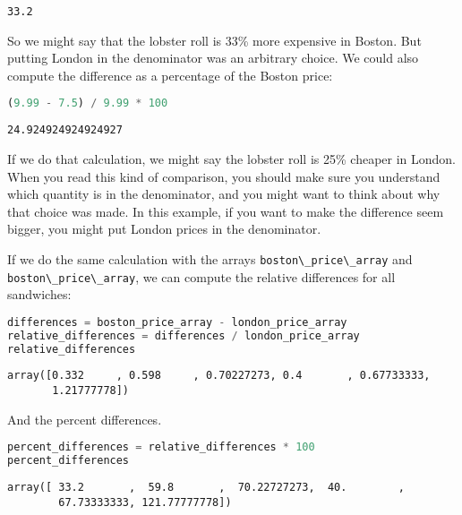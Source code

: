 \begin{lstlisting}[style=output]
33.2
\end{lstlisting}

So we might say that the lobster roll is 33\% more expensive in Boston.
But putting London in the denominator was an arbitrary choice. We could
also compute the difference as a percentage of the Boston price:

\begin{lstlisting}[language=Python,style=source]
(9.99 - 7.5) / 9.99 * 100
\end{lstlisting}

\begin{lstlisting}[style=output]
24.924924924924927
\end{lstlisting}

If we do that calculation, we might say the lobster roll is 25\% cheaper
in London. When you read this kind of comparison, you should make sure
you understand which quantity is in the denominator, and you might want
to think about why that choice was made. In this example, if you want to
make the difference seem bigger, you might put London prices in the
denominator.

If we do the same calculation with the arrays
\passthrough{\lstinline!boston\_price\_array!} and
\passthrough{\lstinline!boston\_price\_array!}, we can compute the
relative differences for all sandwiches:

\begin{lstlisting}[language=Python,style=source]
differences = boston_price_array - london_price_array
relative_differences = differences / london_price_array
relative_differences
\end{lstlisting}

\begin{lstlisting}[style=output]
array([0.332     , 0.598     , 0.70227273, 0.4       , 0.67733333,
       1.21777778])
\end{lstlisting}

And the percent differences.

\begin{lstlisting}[language=Python,style=source]
percent_differences = relative_differences * 100
percent_differences
\end{lstlisting}

\begin{lstlisting}[style=output]
array([ 33.2       ,  59.8       ,  70.22727273,  40.        ,
        67.73333333, 121.77777778])
\end{lstlisting}

